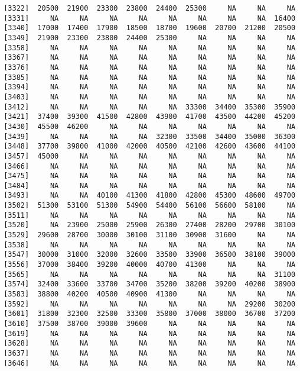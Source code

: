 \documentclass[]{article}
\begin{document}
\begin{verbatim}
 [3322]  20500  21900  23300  23800  24400  25300     NA     NA     NA
 [3331]     NA     NA     NA     NA     NA     NA     NA     NA  16400
 [3340]  17000  17400  17900  18500  18700  19600  20700  21200  20500
 [3349]  21900  23300  23800  24400  25300     NA     NA     NA     NA
 [3358]     NA     NA     NA     NA     NA     NA     NA     NA     NA
 [3367]     NA     NA     NA     NA     NA     NA     NA     NA     NA
 [3376]     NA     NA     NA     NA     NA     NA     NA     NA     NA
 [3385]     NA     NA     NA     NA     NA     NA     NA     NA     NA
 [3394]     NA     NA     NA     NA     NA     NA     NA     NA     NA
 [3403]     NA     NA     NA     NA     NA     NA     NA     NA     NA
 [3412]     NA     NA     NA     NA     NA  33300  34400  35300  35900
 [3421]  37400  39300  41500  42800  43900  41700  43500  44200  45200
 [3430]  45500  46200     NA     NA     NA     NA     NA     NA     NA
 [3439]     NA     NA     NA     NA  32300  33500  34400  35000  36300
 [3448]  37700  39800  41000  42000  40500  42100  42600  43600  44100
 [3457]  45000     NA     NA     NA     NA     NA     NA     NA     NA
 [3466]     NA     NA     NA     NA     NA     NA     NA     NA     NA
 [3475]     NA     NA     NA     NA     NA     NA     NA     NA     NA
 [3484]     NA     NA     NA     NA     NA     NA     NA     NA     NA
 [3493]     NA     NA  40100  41300  41800  42800  45300  48600  49700
 [3502]  51300  53100  51300  54900  54400  56100  56600  58100     NA
 [3511]     NA     NA     NA     NA     NA     NA     NA     NA     NA
 [3520]     NA  23900  25000  25900  26300  27400  28200  29700  30100
 [3529]  29600  28700  30000  30100  31100  30900  31600     NA     NA
 [3538]     NA     NA     NA     NA     NA     NA     NA     NA     NA
 [3547]  30000  31000  32000  32600  33500  33900  36500  38100  39000
 [3556]  37000  38400  39200  40000  40700  41300     NA     NA     NA
 [3565]     NA     NA     NA     NA     NA     NA     NA     NA  31100
 [3574]  32400  33600  33700  34700  35200  38200  39200  40200  38900
 [3583]  38800  40200  40500  40900  41300     NA     NA     NA     NA
 [3592]     NA     NA     NA     NA     NA     NA     NA  29200  30200
 [3601]  31800  32300  32500  33300  35800  37000  38000  36700  37200
 [3610]  37500  38700  39000  39600     NA     NA     NA     NA     NA
 [3619]     NA     NA     NA     NA     NA     NA     NA     NA     NA
 [3628]     NA     NA     NA     NA     NA     NA     NA     NA     NA
 [3637]     NA     NA     NA     NA     NA     NA     NA     NA     NA
 [3646]     NA     NA     NA     NA     NA     NA     NA     NA     NA

\end{verbatim}
\end{document}
